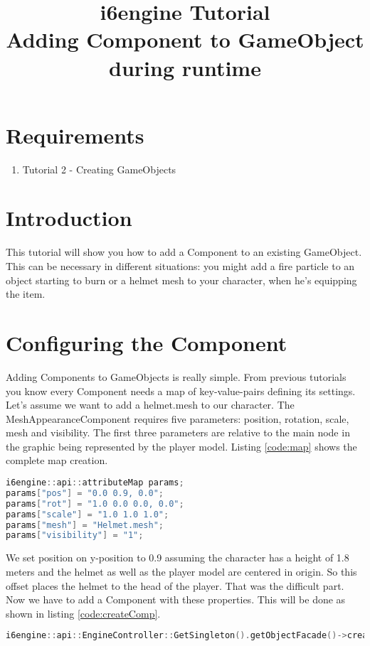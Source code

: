 \documentclass{article}
\title{i6engine Tutorial \\ Adding Component to GameObject during runtime}
\begin{document}
\section{Requirements}

\begin{enumerate}
\item Tutorial 2 - Creating GameObjects
\end{enumerate}

\section{Introduction}

This tutorial will show you how to add a Component to an existing GameObject. This can be necessary in different situations: you might add a fire particle to an object starting to burn or a helmet mesh to your character, when he's equipping the item.

\section{Configuring the Component}

Adding Components to GameObjects is really simple. From previous tutorials you know every Component needs a map of key-value-pairs defining its settings. Let's assume we want to add a helmet.mesh to our character. The MeshAppearanceComponent requires five parameters: position, rotation, scale, mesh and visibility. The first three parameters are relative to the main node in the graphic being represented by the player model. Listing \ref{code:map} shows the complete map creation.

\begin{lstlisting}[language=C++, style=basic, caption={configuring attributeMap}, label=code:map]
i6engine::api::attributeMap params;
params["pos"] = "0.0 0.9, 0.0";
params["rot"] = "1.0 0.0 0.0, 0.0";
params["scale"] = "1.0 1.0 1.0";
params["mesh"] = "Helmet.mesh";
params["visibility"] = "1";
\end{lstlisting}

We set position on y-position to 0.9 assuming the character has a height of 1.8 meters and the helmet as well as the player model are centered in origin. So this offset places the helmet to the head of the player. That was the difficult part. Now we have to add a Component with these properties. This will be done as shown in listing \ref{code:createComp}.

\begin{lstlisting}[language=C++, style=basic, caption={create Component}, label=code:createComp]
i6engine::api::EngineController::GetSingleton().getObjectFacade()->createComponent(goid, i6engine::api::EngineController::GetSingleton().getIDManager()->getID(), "MeshAppearance", params);
\end{lstlisting}
\end{document}
